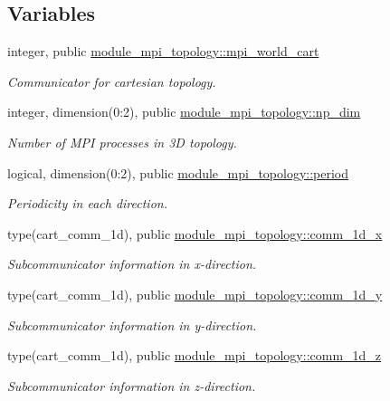 \subsection*{Variables}
\begin{DoxyCompactItemize}
\item 
integer, public \mbox{\hyperlink{namespacemodule__mpi__topology_a3e29ea1f3a4a2d1836560384361e8f8f}{module\+\_\+mpi\+\_\+topology\+::mpi\+\_\+world\+\_\+cart}}
\begin{DoxyCompactList}\small\item\em Communicator for cartesian topology. \end{DoxyCompactList}\item 
integer, dimension(0\+:2), public \mbox{\hyperlink{namespacemodule__mpi__topology_a129f2497619c696b219ad7ea3531d419}{module\+\_\+mpi\+\_\+topology\+::np\+\_\+dim}}
\begin{DoxyCompactList}\small\item\em Number of M\+PI processes in 3D topology. \end{DoxyCompactList}\item 
logical, dimension(0\+:2), public \mbox{\hyperlink{namespacemodule__mpi__topology_a8fd6ae9fc5b86ed659bb09d19f66b472}{module\+\_\+mpi\+\_\+topology\+::period}}
\begin{DoxyCompactList}\small\item\em Periodicity in each direction. \end{DoxyCompactList}\item 
type(cart\+\_\+comm\+\_\+1d), public \mbox{\hyperlink{namespacemodule__mpi__topology_a8fc7176d4696d255810403b7fedf475c}{module\+\_\+mpi\+\_\+topology\+::comm\+\_\+1d\+\_\+x}}
\begin{DoxyCompactList}\small\item\em Subcommunicator information in x-\/direction. \end{DoxyCompactList}\item 
type(cart\+\_\+comm\+\_\+1d), public \mbox{\hyperlink{namespacemodule__mpi__topology_aa3b66781881f19eec6cfe359031972a9}{module\+\_\+mpi\+\_\+topology\+::comm\+\_\+1d\+\_\+y}}
\begin{DoxyCompactList}\small\item\em Subcommunicator information in y-\/direction. \end{DoxyCompactList}\item 
type(cart\+\_\+comm\+\_\+1d), public \mbox{\hyperlink{namespacemodule__mpi__topology_a7e9fd4121125cf62c8259cee18ad3c2f}{module\+\_\+mpi\+\_\+topology\+::comm\+\_\+1d\+\_\+z}}
\begin{DoxyCompactList}\small\item\em Subcommunicator information in z-\/direction. \end{DoxyCompactList}\end{DoxyCompactItemize}


